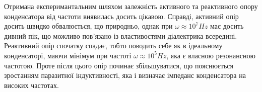 Отримана експеримантальним шляхом залежність активного та реактивного опору конденсатора від частоти виявилась досить цікавою. Справді, активний опір досить швидко обвалюється, що природньо, однак при $\omega \approx 10^7 Hz$ має досить дивний пік, що можливо пов'язано із властивостями діалектрика всередині. Реактивний опір спочатку спадає, тобто поводить себе як в ідеальному конденсаторі, маючи мінімум при частоті $\omega \approx 10^5 Hz$, яка є власною резонансною частотою. Проте після цього опір починає збільшуватися, що пояснюється зростанням паразитної індуктивності, яка і визначає імпеданс конденсатора на високих частотах.

\begin{figure}[h]
    \begin{minipage}[h]{0.47\linewidth}
         \\
    \end{minipage}
    \hfill
    \begin{minipage}[h]{0.47\linewidth}
        \\

\end{minipage}
\end{figure}
